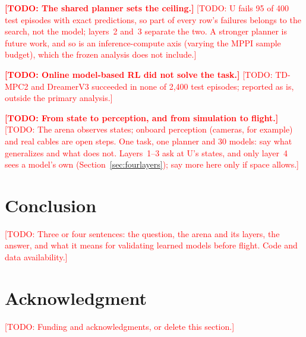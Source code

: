 \documentclass[conference]{IEEEtran}
\newcommand{\todo}[1]{\textcolor{red}{[TODO: #1]}}
\begin{document}
\textbf{\todo{The shared planner sets the ceiling.}} \todo{U fails 95 of 400 test episodes with exact predictions, so part of every row's failures belongs to the search, not the model; layers~2 and~3 separate the two. A stronger planner is future work, and so is an inference-compute axis (varying the MPPI sample budget), which the frozen analysis does not include.}

\textbf{\todo{Online model-based RL did not solve the task.}} \todo{TD-MPC2 and DreamerV3 succeeded in none of 2,400 test episodes; reported as is, outside the primary analysis.}

\textbf{\todo{From state to perception, and from simulation to flight.}} \todo{The arena observes states; onboard perception (cameras, for example) and real cables are open steps. One task, one planner and 30 models: say what generalizes and what does not. Layers~1--3 ask at U's states, and only layer~4 sees a model's own (Section~\ref{sec:fourlayers}); say more here only if space allows.}

\section{Conclusion}\label{sec:conclusion}
\todo{Three or four sentences: the question, the arena and its layers, the answer, and what it means for validating learned models before flight. Code and data availability.}

\section*{Acknowledgment}
\todo{Funding and acknowledgments, or delete this section.}



\end{document}
